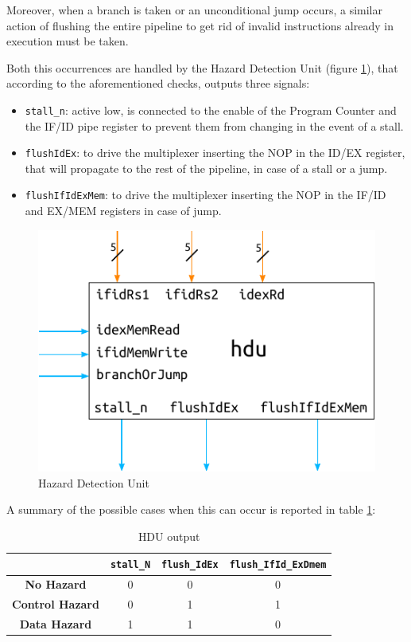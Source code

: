 \documentclass[a4paper]{article}
\begin{document}
Moreover, when a branch is taken or an unconditional jump occurs, a similar action of flushing the entire pipeline to get rid of invalid instructions already in execution must be taken.

Both this occurrences are handled by the Hazard Detection Unit (figure \ref{fig:hdu}), that according to the aforementioned checks, outputs three signals:
\begin{itemize}
    \item \texttt{stall\_n}: active low, is connected to the enable of the Program Counter and the IF/ID pipe register to prevent them from changing in the event of a stall.
    \item \texttt{flushIdEx}: to drive the multiplexer inserting the NOP in the ID/EX register, that will propagate to the rest of the pipeline, in case of a stall or a jump.
    \item \texttt{flushIfIdExMem}: to drive the multiplexer inserting the NOP in the IF/ID and EX/MEM registers in case of jump.
\end{itemize}

\begin{figure}[hbtp]
    \centering
    \includegraphics[]{../hdu/ref/schematic/hdu.pdf}
    \caption{Hazard Detection Unit}
    \label{fig:hdu}
\end{figure}
A summary of the possible cases when this can occur is reported in table \ref{tab:hdu_output}:

\begin{table}[hbtp]
\centering
\begin{tabular}{|c|c|c|c|}
\hline
                        & \texttt{stall\_N} & \texttt{flush\_IdEx} & \texttt{flush\_IfId\_ExDmem} \\ \hline
\textbf{No Hazard}      & 0                          & 0                             & 0                                     \\ \hline
\textbf{Control Hazard} & 0                          & 1                             & 1                                     \\ \hline
\textbf{Data Hazard}    & 1                          & 1                             & 0                                     \\ \hline
\end{tabular}
\caption{HDU output}
\label{tab:hdu_output}
\end{table}
\end{document}
